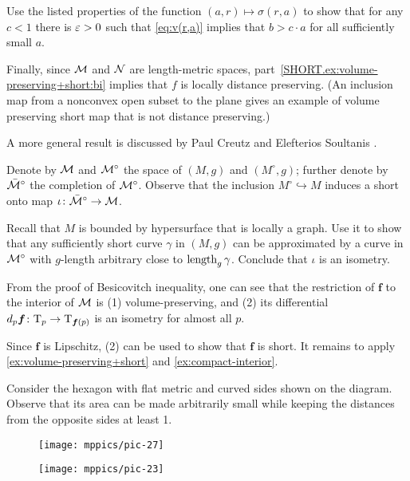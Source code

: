 Use the listed properties of the function $(a,r)\mapsto \sigma(r,a)$ to show that for any $c<1$ there is $\varepsilon>0$ such that \ref{eq:v(r,a)} implies that $b>c\cdot a$ for all sufficiently small $a$.

Finally, since $\mathcal{M}$ and  $\mathcal{N}$ are length-metric spaces, part~\ref{SHORT.ex:volume-preserving+short:bi} implies that $f$ is locally distance preserving.
(An inclusion map from a nonconvex open subset to the plane gives an example of volume preserving short map that is not distance preserving.)


\medskip

A more general result is discussed by Paul Creutz and Elefterios Soultanis \cite{creutz-soultanis}.


 Denote by $\mathcal{M}$ and $\mathcal{M}^\circ$ the space of $(M,g)$ and $(M^\circ,g)$;
further denote by $\bar{\mathcal{M}}^\circ$ the completion of $\mathcal{M}^\circ$.
Observe that the inclusion $M^\circ\hookrightarrow M$ induces a short onto map $\iota\:\bar{\spc{M}}^\circ\z\to\spc{M}$.

Recall that $M$ is bounded by hypersurface that is locally a graph.
Use it to show that any sufficiently short curve $\gamma$ in $(M,g)$ can be approximated by a curve in $\mathcal{M}^\circ$ with $g$-length arbitrary close to $\mathop{\rm length}\nolimits_g\gamma$.
Conclude that $\iota$ is an isometry.


From the proof of Besicovitch inequality, one can see that the restriction of $\bm{f}$ to the interior of $\mathcal{M}$ is
(1) volume-preserving, and 
(2) its differential $d_p\bm{f}\colon\mathrm{T}_p\to \mathrm{T}_{\bm{f}(p)}$ is an isometry for almost all $p$.

Since $\bm{f}$ is Lipschitz, (2) can be used to show that $\bm{f}$ is short.
It remains to apply \ref{ex:volume-preserving+short} and \ref{ex:compact-interior}.

Consider the hexagon with flat metric and curved sides shown on the diagram.
Observe that its area can be made arbitrarily small while keeping the distances from the opposite sides at least 1.

\begin{figure}[!ht]
\begin{minipage}{.48\textwidth}
\centering
\texttt{[image: mppics/pic-27]}
\end{minipage}\hfill
\begin{minipage}{.48\textwidth}
\centering
\texttt{[image: mppics/pic-23]}
\end{minipage}
\vskip-4mm
\end{figure}

